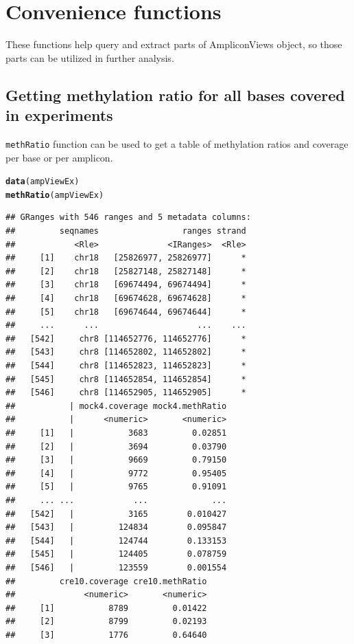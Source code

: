 \documentclass{article}\usepackage[]{graphicx}\usepackage[]{color}
\makeatletter
\newcommand{\hlstd}[1]{\textcolor[rgb]{0.345,0.345,0.345}{#1}}%
\newcommand{\hlkwd}[1]{\textcolor[rgb]{0.737,0.353,0.396}{\textbf{#1}}}%
\newenvironment{kframe}{%
 \def\at@end@of@kframe{}%
 \ifinner\ifhmode%
  \def\at@end@of@kframe{\end{minipage}}%
  \begin{minipage}{\columnwidth}%
 \fi\fi%
 \def\FrameCommand##1{\hskip\@totalleftmargin \hskip-\fboxsep
 \colorbox{shadecolor}{##1}\hskip-\fboxsep
     \hskip-\linewidth \hskip-\@totalleftmargin \hskip\columnwidth}%
 \MakeFramed {\advance\hsize-\width
   \@totalleftmargin\z@ \linewidth\hsize
   \@setminipage}}%
 {\par\unskip\endMakeFramed%
 \at@end@of@kframe}
\newenvironment{knitrout}{}{} %
\makeatother
\begin{document}
\section{Convenience functions}
These functions help query and extract parts of AmpliconViews object, so those parts can
be utilized in further analysis.

\subsection{Getting methylation ratio for all bases covered in experiments}
\texttt{methRatio} function can be used to get a table of methylation ratios and
coverage per base or per amplicon.
\begin{knitrout}
\color{fgcolor}\begin{kframe}
\begin{alltt}
\hlkwd{data}\hlstd{(ampViewEx)}
\hlkwd{methRatio}\hlstd{(ampViewEx)}
\end{alltt}
\begin{verbatim}
## GRanges with 546 ranges and 5 metadata columns:
##         seqnames                 ranges strand
##            <Rle>              <IRanges>  <Rle>
##     [1]    chr18   [25826977, 25826977]      *
##     [2]    chr18   [25827148, 25827148]      *
##     [3]    chr18   [69674494, 69674494]      *
##     [4]    chr18   [69674628, 69674628]      *
##     [5]    chr18   [69674644, 69674644]      *
##     ...      ...                    ...    ...
##   [542]     chr8 [114652776, 114652776]      *
##   [543]     chr8 [114652802, 114652802]      *
##   [544]     chr8 [114652823, 114652823]      *
##   [545]     chr8 [114652854, 114652854]      *
##   [546]     chr8 [114652905, 114652905]      *
##           | mock4.coverage mock4.methRatio
##           |      <numeric>       <numeric>
##     [1]   |           3683         0.02851
##     [2]   |           3694         0.03790
##     [3]   |           9669         0.79150
##     [4]   |           9772         0.95405
##     [5]   |           9765         0.91091
##     ... ...            ...             ...
##   [542]   |           3165        0.010427
##   [543]   |         124834        0.095847
##   [544]   |         124744        0.133153
##   [545]   |         124405        0.078759
##   [546]   |         123559        0.001554
##         cre10.coverage cre10.methRatio
##              <numeric>       <numeric>
##     [1]           8789         0.01422
##     [2]           8799         0.02193
##     [3]           1776         0.64640

\end{verbatim}
\end{kframe}
\end{knitrout}
\end{document}
